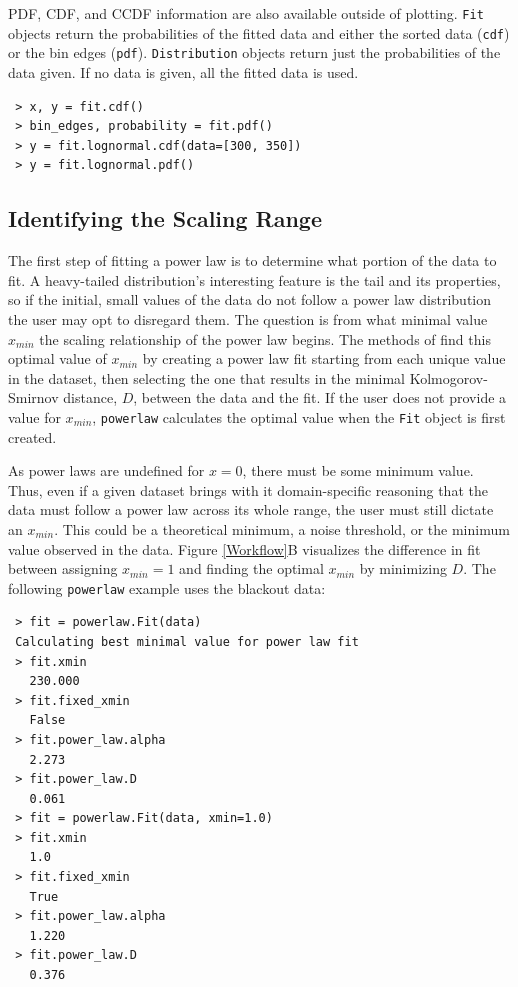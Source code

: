 \documentclass[10pt]{article}
\begin{document}
 PDF, CDF, and CCDF information are also available outside of plotting. \verb"Fit" objects return the probabilities of the fitted data and either the sorted data (\verb"cdf") or the bin edges (\verb"pdf"). \verb"Distribution" objects return just the probabilities of the data given. If no data is given, all the fitted data is used.
 
 \begin{verbatim}
 > x, y = fit.cdf()
 > bin_edges, probability = fit.pdf()
 > y = fit.lognormal.cdf(data=[300, 350])
 > y = fit.lognormal.pdf()
 \end{verbatim}
 
 \subsection*{Identifying the Scaling Range}
 The first step of fitting a power law is to determine what portion of the data to fit. A heavy-tailed distribution's interesting feature is the tail and its properties, so if the initial, small values of the data do not follow a power law distribution the user may opt to disregard them. The question is from what minimal value $x_{min}$ the scaling relationship of the power law begins. The methods of \cite{Clauset2009} find this optimal value of $x_{min}$ by creating a power law fit starting from each unique value in the dataset, then selecting the one that results in the minimal Kolmogorov-Smirnov distance, $D$, between the data and the fit. If the user does not provide a value for $x_{min}$, \verb$powerlaw$ calculates the optimal value when the \verb$Fit$ object is first created. 
 
 As power laws are undefined for $x=0$, there must be some minimum value. Thus, even if a given dataset brings with it domain-specific reasoning that the data must follow a power law across its whole range, the user must still dictate an $x_{min}$. This could be a theoretical minimum, a noise threshold, or the minimum value observed in the data. Figure \ref{Workflow}B visualizes the difference in fit between assigning $x_{min}=1$ and finding the optimal $x_{min}$ by minimizing $D$. The following \verb$powerlaw$ example uses the blackout data:
 
 \begin{verbatim}
 > fit = powerlaw.Fit(data)
 Calculating best minimal value for power law fit
 > fit.xmin
   230.000
 > fit.fixed_xmin
   False
 > fit.power_law.alpha
   2.273
 > fit.power_law.D
   0.061
 > fit = powerlaw.Fit(data, xmin=1.0)
 > fit.xmin
   1.0
 > fit.fixed_xmin
   True
 > fit.power_law.alpha
   1.220
 > fit.power_law.D
   0.376
 \end{verbatim}
 
\end{document}
